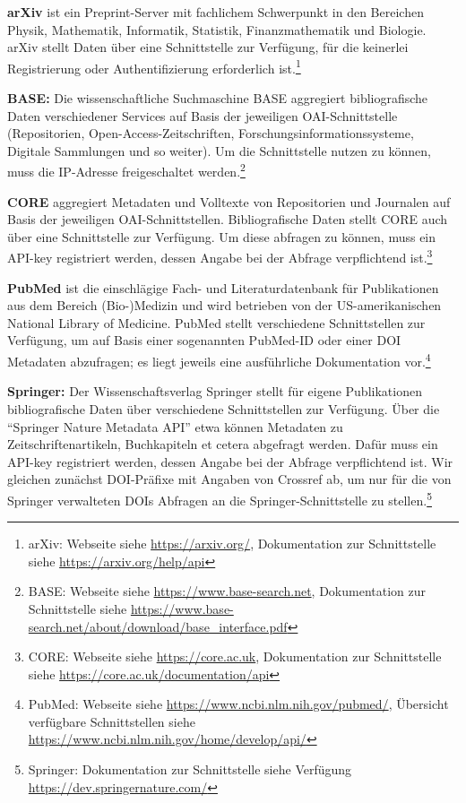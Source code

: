 \documentclass[a4paper,
fontsize=11pt,
oneside,
numbers=noperiodatend,
parskip=half-,
bibliography=totoc,
final
]{scrartcl}
\begin{document}
\textbf{arXiv} ist ein Preprint-Server mit fachlichem Schwerpunkt in den
Bereichen Physik, Mathematik, Informatik, Statistik, Finanzmathematik
und Biologie. arXiv stellt Daten über eine Schnittstelle zur Verfügung,
für die keinerlei Registrierung oder Authentifizierung erforderlich
ist.\footnote{arXiv: Webseite siehe \url{https://arxiv.org/},
  Dokumentation zur Schnittstelle siehe \url{https://arxiv.org/help/api}}

\textbf{BASE:} Die wissenschaftliche Suchmaschine BASE aggregiert
bibliografische Daten verschiedener Services auf Basis der jeweiligen
OAI-Schnittstelle (Repositorien, Open-Access-Zeitschriften,
Forschungsinformationssysteme, Digitale Sammlungen und so weiter). Um
die Schnittstelle nutzen zu können, muss die IP-Adresse freigeschaltet
werden.\footnote{BASE: Webseite siehe \url{https://www.base-search.net},
  Dokumentation zur Schnittstelle siehe
  \url{https://www.base-search.net/about/download/base_interface.pdf}}

\textbf{CORE} aggregiert Metadaten und Volltexte von Repositorien und
Journalen auf Basis der jeweiligen OAI-Schnittstellen. Bibliografische
Daten stellt CORE auch über eine Schnittstelle zur Verfügung. Um diese
abfragen zu können, muss ein API-key registriert werden, dessen Angabe
bei der Abfrage verpflichtend ist.\footnote{CORE: Webseite siehe
  \url{https://core.ac.uk}, Dokumentation zur Schnittstelle siehe
  \url{https://core.ac.uk/documentation/api}}

\textbf{PubMed} ist die einschlägige Fach- und Literaturdatenbank für
Publikationen aus dem Bereich (Bio-)Medizin und wird betrieben von der
US-amerikanischen National Library of Medicine. PubMed stellt
verschiedene Schnittstellen zur Verfügung, um auf Basis einer
sogenannten Pub\-Med-ID oder einer DOI Metadaten abzufragen; es liegt
jeweils eine ausführliche Dokumentation vor.\footnote{PubMed: Webseite
  siehe \url{https://www.ncbi.nlm.nih.gov/pubmed/}, Übersicht verfügbare
  Schnittstellen siehe
  \url{https://www.ncbi.nlm.nih.gov/home/develop/api/}}

\textbf{Springer:} Der Wissenschaftsverlag Springer stellt für eigene
Publikationen bibliografische Daten über verschiedene Schnittstellen zur
Verfügung. Über die \enquote{Springer Nature Metadata API} etwa können
Metadaten zu Zeitschriftenartikeln, Buchkapiteln et cetera abgefragt
werden. Dafür muss ein API-key registriert werden, dessen Angabe bei der
Abfrage verpflichtend ist. Wir gleichen zunächst DOI-Präfixe mit Angaben
von Crossref ab, um nur für die von Springer verwalteten DOIs Abfragen
an die Springer-Schnittstelle zu stellen.\footnote{Springer:
  Dokumentation zur Schnittstelle siehe Verfügung
  \url{https://dev.springernature.com/}}
\end{document}
